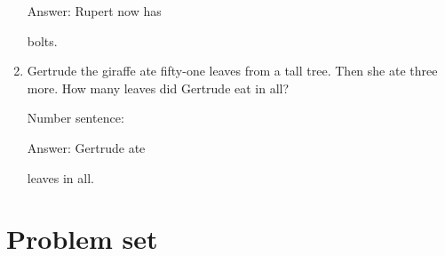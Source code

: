 \documentclass{tufte-book}
\begin{document}
\begin{enumerate}
  Answer: Rupert now has
  \dotfill\medskip\par\mbox{}\dotfill\medskip\par\mbox{}\dotfill\bigskip
  bolts.
\item
  Gertrude the giraffe ate fifty-one leaves from a tall tree. Then she
  ate three more. How many leaves did Gertrude eat in all?\medskip\par
  Number sentence:
  \dotfill\medskip\par
  Answer: Gertrude ate
  \dotfill\medskip\par\mbox{}\dotfill\medskip\par\mbox{}\dotfill\bigskip
  leaves in all.
\end{enumerate}



\clearpage\section{Problem set }
\end{document}
